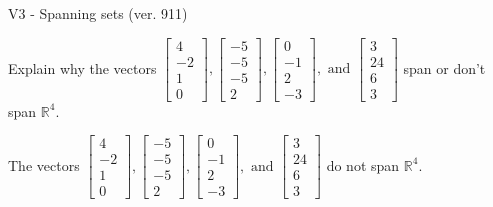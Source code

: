 \begin{exercise}
  \begin{exerciseTitle}V3 - Spanning sets (ver. 911)\end{exerciseTitle}
  \begin{exerciseStatement}
    Explain why the vectors \(\left[\begin{array}{r}
4 \\
-2 \\
1 \\
0
\end{array}\right] , \left[\begin{array}{r}
-5 \\
-5 \\
-5 \\
2
\end{array}\right] , \left[\begin{array}{r}
0 \\
-1 \\
2 \\
-3
\end{array}\right] , \text{ and } \left[\begin{array}{r}
3 \\
24 \\
6 \\
3
\end{array}\right]\) span or don't span \(\mathbb{R}^4\). 
	


  \end{exerciseStatement}
  \begin{exerciseAnswer}
   The vectors \(\left[\begin{array}{r}
4 \\
-2 \\
1 \\
0
\end{array}\right] , \left[\begin{array}{r}
-5 \\
-5 \\
-5 \\
2
\end{array}\right] , \left[\begin{array}{r}
0 \\
-1 \\
2 \\
-3
\end{array}\right] , \text{ and } \left[\begin{array}{r}
3 \\
24 \\
6 \\
3
\end{array}\right]\) 
  	 do not  
	span \(\mathbb{R}^4\).
  


  \end{exerciseAnswer}
\end{exercise}